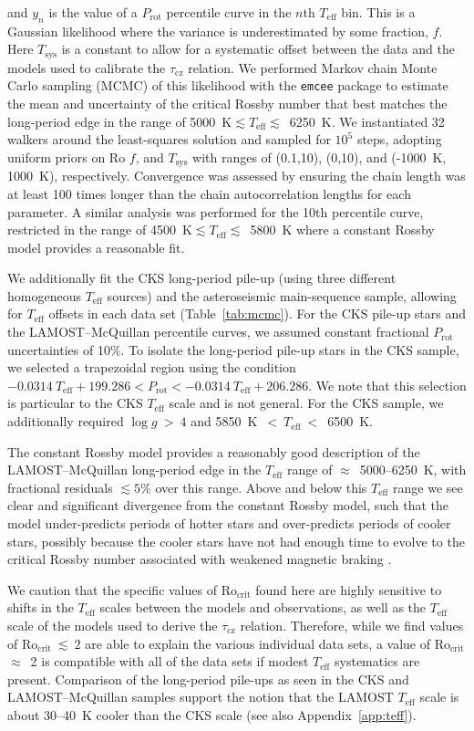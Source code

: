 \documentclass[linenumbers,trackchanges,twocolumn]{aastex631}
\newcommand{\taucz}{$\tau_\mathrm{cz}$\xspace}
\newcommand{\rocrit}{$\mathrm{Ro_{crit}}$\xspace}
\newcommand{\rocritfinal}{$\mathrm{Ro_{crit}}~\lesssim~2$\xspace}
\newcommand{\lamostmcq}{LAMOST--McQuillan\xspace}
\newcommand{\teff}{\ensuremath{T_{\mathrm{eff}}}\xspace}
\newcommand{\logg}{\ensuremath{\log g}\xspace}
\newcommand{\prot}{\ensuremath{P_\mathrm{rot}}\xspace}
\begin{document}
and $y_n$ is the value of a \prot percentile curve in the $n$th \teff bin. This is a Gaussian likelihood where the variance is underestimated by some fraction, $f$. Here $T_\mathrm{sys}$ is a constant to allow for a systematic offset between the data and the models used to calibrate the \taucz relation. We performed Markov chain Monte Carlo sampling (MCMC) of this likelihood with the \texttt{emcee} package \citep{emcee2013, emcee2019} to estimate the mean and uncertainty of the critical Rossby number that best matches the long-period edge in the range of 5000~K$\lesssim \teff \lesssim$~6250~K. We instantiated 32 walkers around the least-squares solution and sampled for $10^5$ steps, adopting uniform priors on Ro $f$, and $T_\mathrm{sys}$ with ranges of (0.1,10), (0,10), and (-1000~K, 1000~K), respectively. Convergence was assessed by ensuring the chain length was at least 100 times longer than the chain autocorrelation lengths for each parameter. A similar analysis was performed for the 10th percentile curve, restricted in the range of 4500~K$\lesssim \teff \lesssim$~5800~K where a constant Rossby model provides a reasonable fit. 

We additionally fit the CKS long-period pile-up (using three different homogeneous \teff sources) and the \citet{Hall2021} asteroseismic main-sequence sample, allowing for \teff offsets in each data set (Table~\ref{tab:mcmc}). For the CKS pile-up stars and the \lamostmcq percentile curves, we assumed constant fractional \prot uncertainties of 10\%. To isolate the long-period pile-up stars in the CKS sample, we selected a trapezoidal region using the condition $-0.0314~\teff + 199.286 < \prot < -0.0314~\teff + 206.286$. We note that this selection is particular to the CKS \teff scale and is not general. For the CKS sample, we additionally required $\logg~>~4$ and 5850~K~$<~\teff~<$~6500~K. 

The constant Rossby model provides a reasonably good description of the \lamostmcq long-period edge in the \teff range of $\approx$~5000--6250~K, with fractional residuals $\lesssim5\%$ over this range. Above and below this \teff range we see clear and significant divergence from the constant Rossby model, such that the model under-predicts periods of hotter stars and over-predicts periods of cooler stars, possibly because the cooler stars have not had enough time to evolve to the critical Rossby number associated with weakened magnetic braking \citep[see Figure 6 in][]{vanSaders2019}.

We caution that the specific values of \rocrit found here are highly sensitive to shifts in the \teff scales between the models and observations, as well as the \teff scale of the models used to derive the \taucz relation. Therefore, while we find values of \rocritfinal are able to explain the various individual data sets, a value of \rocrit  $\approx$~2 is compatible with all of the data sets if modest \teff systematics are present. Comparison of the long-period pile-ups as seen in the CKS and \lamostmcq samples support the notion that the LAMOST \teff scale is about 30--40~K cooler than the CKS scale (see also Appendix~\ref{app:teff}).
\end{document}

